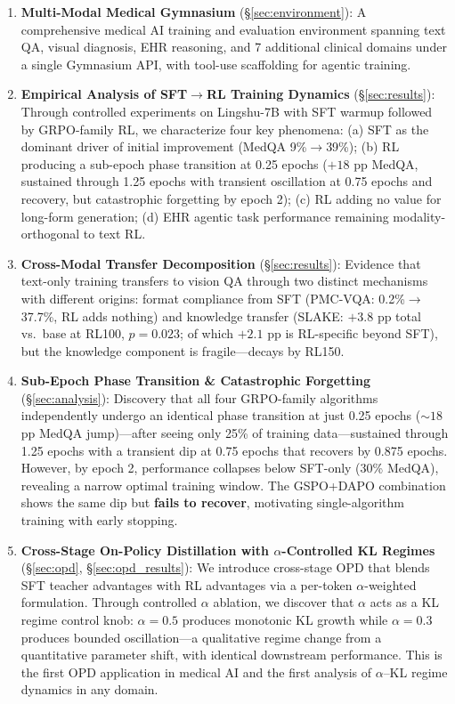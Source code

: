 \documentclass{article}
\begin{document}
\begin{enumerate}[leftmargin=*]
    \item \textbf{Multi-Modal Medical Gymnasium} (\S\ref{sec:environment}): A comprehensive medical AI training and evaluation environment spanning text QA, visual diagnosis, EHR reasoning, and 7 additional clinical domains under a single Gymnasium API, with tool-use scaffolding for agentic training.

    \item \textbf{Empirical Analysis of SFT$\to$RL Training Dynamics} (\S\ref{sec:results}): Through controlled experiments on Lingshu-7B with SFT warmup followed by GRPO-family RL, we characterize four key phenomena: (a) SFT as the dominant driver of initial improvement (MedQA 9\%$\to$39\%); (b) RL producing a sub-epoch phase transition at 0.25 epochs ($+18$ pp MedQA, sustained through 1.25 epochs with transient oscillation at 0.75 epochs and recovery, but catastrophic forgetting by epoch 2); (c) RL adding no value for long-form generation; (d) EHR agentic task performance remaining modality-orthogonal to text RL.

    \item \textbf{Cross-Modal Transfer Decomposition} (\S\ref{sec:results}): Evidence that text-only training transfers to vision QA through two distinct mechanisms with different origins: format compliance from SFT (PMC-VQA: 0.2\%$\to$37.7\%, RL adds nothing) and knowledge transfer (SLAKE: $+3.8$ pp total vs.\ base at RL100, $p{=}0.023$; of which $+2.1$ pp is RL-specific beyond SFT), but the knowledge component is fragile---decays by RL150.

    \item \textbf{Sub-Epoch Phase Transition \& Catastrophic Forgetting} (\S\ref{sec:analysis}): Discovery that all four GRPO-family algorithms independently undergo an identical phase transition at just 0.25 epochs (${\sim}18$ pp MedQA jump)---after seeing only 25\% of training data---sustained through 1.25 epochs with a transient dip at 0.75 epochs that recovers by 0.875 epochs. However, by epoch 2, performance collapses below SFT-only (30\% MedQA), revealing a narrow optimal training window. The GSPO+DAPO combination shows the same dip but \textbf{fails to recover}, motivating single-algorithm training with early stopping.

    \item \textbf{Cross-Stage On-Policy Distillation with $\alpha$-Controlled KL Regimes} (\S\ref{sec:opd}, \S\ref{sec:opd_results}): We introduce cross-stage OPD that blends SFT teacher advantages with RL advantages via a per-token $\alpha$-weighted formulation. Through controlled $\alpha$ ablation, we discover that $\alpha$ acts as a KL regime control knob: $\alpha{=}0.5$ produces monotonic KL growth while $\alpha{=}0.3$ produces bounded oscillation---a qualitative regime change from a quantitative parameter shift, with identical downstream performance. This is the first OPD application in medical AI and the first analysis of $\alpha$--KL regime dynamics in any domain.


\end{enumerate}
\end{document}
